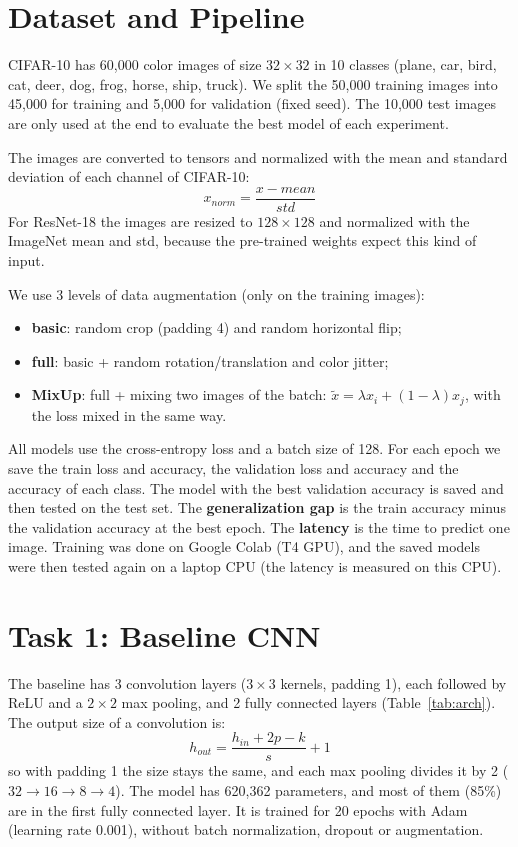 \documentclass[conference]{IEEEtran}
\begin{document}
\section{Dataset and Pipeline}
CIFAR-10 has 60,000 color images of size $32\times32$ in 10 classes (plane, car, bird, cat, deer, dog, frog, horse,
ship, truck). We split the 50,000 training images into 45,000 for training and 5,000 for validation (fixed seed). The
10,000 test images are only used at the end to evaluate the best model of each experiment.

The images are converted to tensors and normalized with the mean and standard deviation of each channel of CIFAR-10:
\begin{equation}
x_{norm} = \frac{x - mean}{std}
\end{equation}
For ResNet-18 the images are resized to $128\times128$ and normalized with the ImageNet mean and std, because the
pre-trained weights expect this kind of input.

We use 3 levels of data augmentation (only on the training images):
\begin{itemize}
\item \textbf{basic}: random crop (padding 4) and random horizontal flip;
\item \textbf{full}: basic + random rotation/translation and color jitter;
\item \textbf{MixUp}: full + mixing two images of the batch: $\tilde{x} = \lambda x_i + (1-\lambda) x_j$, with the
loss mixed in the same way.
\end{itemize}

All models use the cross-entropy loss and a batch size of 128. For each epoch we save the train loss and accuracy, the
validation loss and accuracy and the accuracy of each class. The model with the best validation accuracy is saved and
then tested on the test set. The \textbf{generalization gap} is the train accuracy minus the validation accuracy at the
best epoch. The \textbf{latency} is the time to predict one image. Training was done on Google Colab (T4 GPU), and the
saved models were then tested again on a laptop CPU (the latency is measured on this CPU).

\section{Task 1: Baseline CNN}
The baseline has 3 convolution layers ($3\times3$ kernels, padding 1), each followed by ReLU and a $2\times2$ max
pooling, and 2 fully connected layers (Table~\ref{tab:arch}). The output size of a convolution is:
\begin{equation}
h_{out} = \frac{h_{in} + 2p - k}{s} + 1
\end{equation}
so with padding 1 the size stays the same, and each max pooling divides it by 2 ($32 \rightarrow 16 \rightarrow 8
\rightarrow 4$). The model has 620,362 parameters, and most of them (85\%) are in the first fully connected layer.
It is trained for 20 epochs with Adam (learning rate 0.001), without batch normalization, dropout or augmentation.
\end{document}
